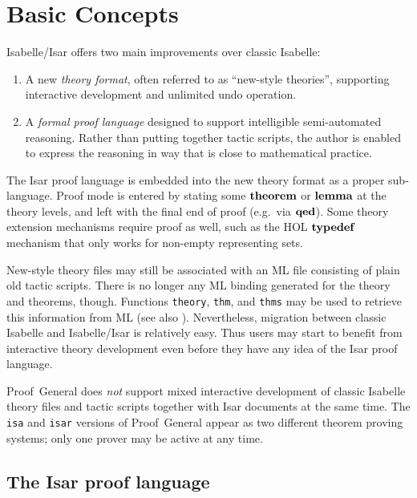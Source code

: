
\chapter{Basic Concepts}\label{ch:basics}

Isabelle/Isar offers two main improvements over classic Isabelle:
\begin{enumerate}
\item A new \emph{theory format}, often referred to as ``new-style theories'',
  supporting interactive development and unlimited undo operation.
\item A \emph{formal proof language} designed to support intelligible
  semi-automated reasoning.  Rather than putting together tactic scripts, the
  author is enabled to express the reasoning in way that is close to
  mathematical practice.
\end{enumerate}

The Isar proof language is embedded into the new theory format as a proper
sub-language.  Proof mode is entered by stating some ${\mathord{\mathbf{theorem}}}$ or
${\mathord{\mathbf{lemma}}}$ at the theory levels, and left with the final end of proof (e.g.\ 
via ${\mathord{\mathbf{qed}}}$).  Some theory extension mechanisms require proof as well, such
as the HOL ${\mathord{\mathbf{typedef}}}$ mechanism that only works for non-empty
representing sets.

New-style theory files may still be associated with an ML file consisting of
plain old tactic scripts.  There is no longer any ML binding generated for the
theory and theorems, though.  Functions \texttt{theory}, \texttt{thm}, and
\texttt{thms} may be used to retrieve this information from ML (see also
\cite{isabelle-ref}).  Nevertheless, migration between classic Isabelle and
Isabelle/Isar is relatively easy.  Thus users may start to benefit from
interactive theory development even before they have any idea of the Isar
proof language.

\begin{warn}
  Proof~General does \emph{not} support mixed interactive development of
  classic Isabelle theory files and tactic scripts together with Isar
  documents at the same time.  The \texttt{isa} and \texttt{isar} versions of
  Proof~General appear as two different theorem proving systems; only one
  prover may be active at any time.
\end{warn}


\section{The Isar proof language}

